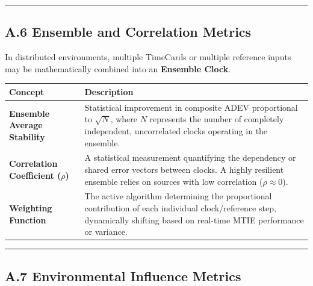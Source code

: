 \begin{center}\rule{0.5\linewidth}{0.5pt}\end{center}

\subsection{A.6 Ensemble and Correlation
Metrics}\label{a.6-ensemble-and-correlation-metrics}

In distributed environments, multiple TimeCards or multiple reference
inputs may be mathematically combined into an \textbf{Ensemble Clock}.

{\def\LTcaptype{none} %
\begin{longtable}[]{@{}
  >{\raggedright\arraybackslash}p{}
  >{\raggedright\arraybackslash}p{}@{}}
\toprule\noalign{}
\begin{minipage}[b]{\linewidth}\raggedright
Concept
\end{minipage} & \begin{minipage}[b]{\linewidth}\raggedright
Description
\end{minipage} \\
\midrule\noalign{}
\endhead
\bottomrule\noalign{}
\endlastfoot
\textbf{Ensemble Average Stability} & Statistical improvement in
composite ADEV proportional to \(\sqrt{N}\), where \(N\) represents the
number of completely independent, uncorrelated clocks operating in the
ensemble. \\
\textbf{Correlation Coefficient (\(\rho\))} & A statistical measurement
quantifying the dependency or shared error vectors between clocks. A
highly resilient ensemble relies on sources with low correlation
(\(\rho \approx 0\)). \\
\textbf{Weighting Function} & The active algorithm determining the
proportional contribution of each individual clock/reference step,
dynamically shifting based on real-time MTIE performance or variance. \\
\end{longtable}
}

\begin{center}\rule{0.5\linewidth}{0.5pt}\end{center}

\subsection{A.7 Environmental Influence
Metrics}\label{a.7-environmental-influence-metrics}

